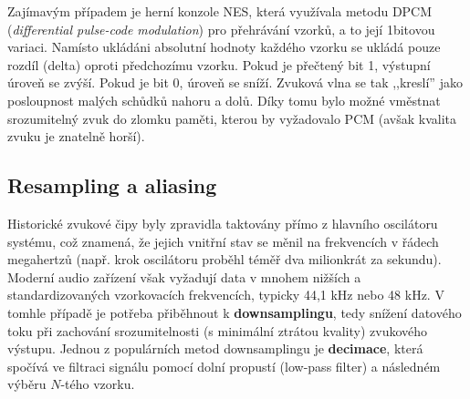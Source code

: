 Zajímavým případem je herní konzole NES, která využívala metodu DPCM (\textit{differential
pulse-code modulation}) pro přehrávání vzorků, a to její 1bitovou variaci. Namísto ukládáni
absolutní hodnoty každého vzorku se ukládá pouze rozdíl (delta) oproti předchozímu vzorku. Pokud je
přečtený bit 1, výstupní úroveň se zvýší. Pokud je bit 0, úroveň se sníží. Zvuková vlna se tak
,,kreslí'' jako posloupnost malých schůdků nahoru a dolů. Díky tomu bylo možné vměstnat srozumitelný
zvuk do zlomku paměti, kterou by vyžadovalo PCM (avšak kvalita zvuku je znatelně horší).

\subsection{Resampling a aliasing}
\label{sub:downsampling}

Historické zvukové čipy byly zpravidla taktovány přímo z hlavního oscilátoru systému, což znamená,
že jejich vnitřní stav se měnil na frekvencích v řádech megahertzů (např. krok oscilátoru proběhl
téměř dva milionkrát za sekundu). Moderní audio zařízení však vyžadují data v mnohem nižších a
standardizovaných vzorkovacích frekvencích, typicky 44,1 kHz nebo 48 kHz. V tomhle případě je
potřeba přiběhnout k \textbf{downsamplingu}, tedy snížení datového toku při zachování
srozumitelnosti (s minimální ztrátou kvality) zvukového výstupu. Jednou z populárních metod
downsamplingu je \textbf{decimace}, která spočívá ve filtraci signálu pomocí dolní propustí
(low-pass filter) a následném výběru $N$-tého vzorku.\cite{dsp101-decim-intrp}
